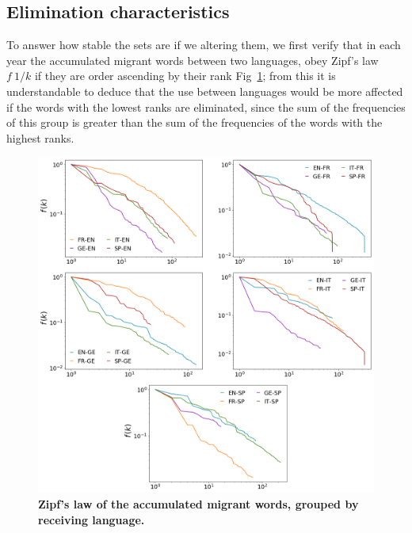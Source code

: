 \documentclass[10pt,letterpaper]{article} %
\begin{document}
\subsection*{Elimination characteristics}

To answer how stable the sets are if we altering them, we first verify that in
each year the accumulated migrant words between two languages, obey Zipf's law
$f~1/k$ if they are order ascending by their rank Fig~\ref{fig.ZL_receiving};
from this it is understandable to deduce that the use between languages would
be more affected if the words with the lowest ranks are eliminated, since the
sum of the frequencies of this group is greater than the sum of the frequencies
of the words with the highest ranks.
\begin{figure}[!h]
	\begin{adjustwidth}{-2.5cm}{1cm}
		\centering
		\includegraphics[scale=.38]{ZL_receptor.png}
		\caption{{\bf Zipf's law of the accumulated migrant words, grouped by receiving language.} }
		\label{fig.ZL_receiving}
	\end{adjustwidth}
\end{figure}
\end{document}

